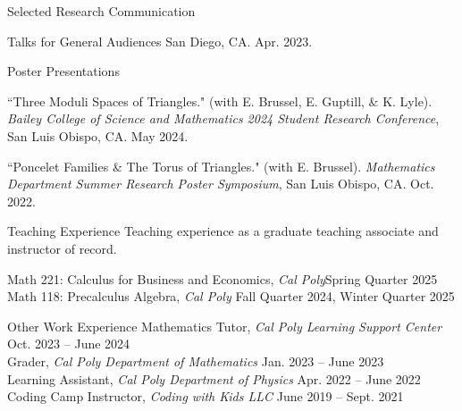 \documentclass[
	11pt, %
]{cv} %
\begin{document}
\begin{rSection}{Selected Research Communication}
\begin{rSubsectionNumbered}{Talks for General Audiences}
		San Diego, CA. Apr. 2023.
	\end{rSubsectionNumbered}
	\begin{rSubsectionNumbered}{Poster Presentations}
		\item ``Three Moduli Spaces of Triangles." (with E. Brussel, E. Guptill, \& K. Lyle).  \textit{Bailey College of Science and Mathematics 2024 Student Research Conference}, San Luis Obispo, CA. May 2024.
		\item ``Poncelet Families \& The Torus of Triangles." (with E. Brussel). \textit{ Mathematics Department Summer Research Poster Symposium}, San Luis Obispo, CA. Oct. 2022.
	\end{rSubsectionNumbered}

	
\end{rSection}

\begin{rSection}{Teaching Experience}
	Teaching experience as a graduate teaching associate and instructor of record.

	Math 221: Calculus for Business and Economics, \textit{Cal Poly}\dotfill Spring Quarter 2025 \\
	Math 118: Precalculus Algebra, \textit{Cal Poly} \dotfill Fall Quarter 2024, Winter Quarter 2025
\end{rSection}

\begin{rSection}{Other Work Experience}
	Mathematics Tutor, \textit{Cal Poly Learning Support Center} \dotfill Oct. 2023 -- June 2024 \\
	Grader, \textit{Cal Poly Department of Mathematics} \dotfill Jan. 2023 -- June 2023 \\
	Learning Assistant, \textit{Cal Poly Department of Physics} \dotfill Apr. 2022 -- June 2022 \\
	Coding Camp Instructor, \textit{Coding with Kids LLC} \dotfill June 2019 -- Sept. 2021
\end{rSection}
\end{document}
